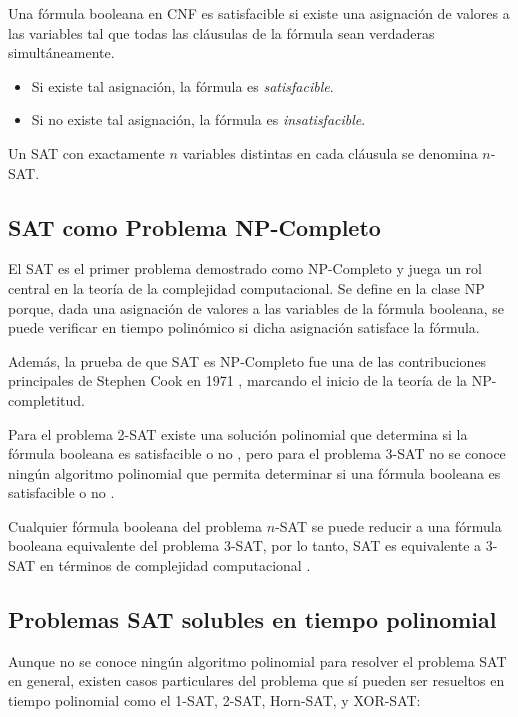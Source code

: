Una fórmula booleana en CNF es satisfacible si existe una asignación de valores a las variables tal que todas las cláusulas de la fórmula sean verdaderas simultáneamente.

\begin{itemize}
  \item Si existe tal asignación, la fórmula es \textit{satisfacible}.
  \item Si no existe tal asignación, la fórmula es \textit{insatisfacible}.
\end{itemize}

Un SAT con exactamente $n$ variables distintas en cada cláusula se denomina $n$-SAT.
\subsection{SAT como Problema NP-Completo}

El SAT es el primer problema demostrado como NP-Completo \cite{authomataTheory} y juega un rol central en la teoría de la complejidad computacional. Se define en la clase NP porque, dada una asignación de valores a las variables de la fórmula booleana, se puede verificar en tiempo polinómico si dicha asignación satisface la fórmula.

Además, la prueba de que SAT es NP-Completo fue una de las contribuciones principales de Stephen Cook en 1971 \cite{authomataTheory}, marcando el inicio de la teoría de la NP-completitud.

Para el problema 2-SAT existe una solución polinomial que determina si la fórmula booleana es satisfacible o no \cite{2satbib}, pero para el problema 3-SAT no se conoce ningún algoritmo polinomial que permita
determinar si una fórmula booleana es satisfacible o no \cite{authomataTheory}.

Cualquier fórmula booleana del problema $n$-SAT se puede reducir a una fórmula booleana equivalente del problema 3-SAT, 
por lo tanto, SAT es equivalente a 3-SAT en términos de complejidad computacional \cite{authomataTheory}.

\subsection{Problemas SAT solubles en tiempo polinomial}

Aunque no se conoce ningún algoritmo polinomial para resolver el problema SAT en general,
existen casos particulares del problema que sí pueden ser resueltos en tiempo polinomial como el 1-SAT, 2-SAT, Horn-SAT, y XOR-SAT:

